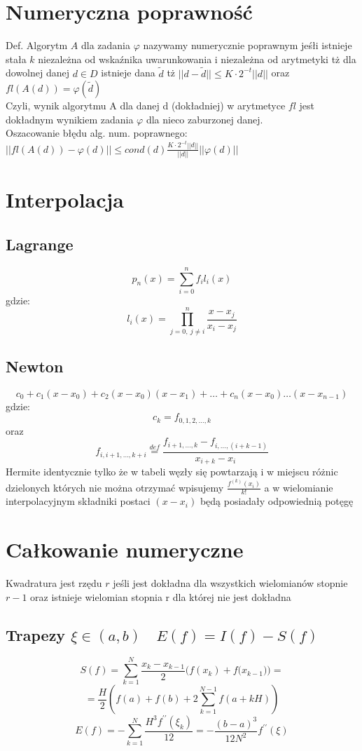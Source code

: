 \documentclass[twocolumn]{article}
\begin{document}
\begin{flushleft}
\section{Numeryczna poprawność}
Def. Algorytm $A$ dla zadania $\varphi$ nazywamy numerycznie poprawnym jeśłi istnieje stała $k$ niezależna od wskaźnika uwarunkowania i niezależna od arytmetyki tż dla dowolnej danej $d \in D$ istnieje dana $\widetilde{d}$ tż $||d-\widetilde{d}|| \leq K\cdot 2^{-t}||d||$ oraz $fl(A(d)) = \varphi(\widetilde{d})$\\
Czyli, wynik algorytmu A dla danej d (dokładniej) w arytmetyce $fl$ jest dokładnym wynikiem zadania $\varphi$ dla nieco zaburzonej danej.\\
Oszacowanie błędu alg. num. poprawnego:\\
$||fl(A(d)) - \varphi(d)|| \leq cond(d) \frac{K\cdot2^{-t}||d||}{||d||}||\varphi(d)||$

\section{Interpolacja}
\subsection{Lagrange}
$$p_{n}(x) = \sum_{i=0}^{n}f_{i}l_{i}(x)$$
gdzie: $$l_i(x) = \prod_{{j = 0},\ {j \neq i}}^{n} \frac{x - x_{j}}{x_{i} - x_{j}}$$
\subsection{Newton}
$$c_{0} + c_{1}(x-x_{0}) + c_{2}(x-x_{0})(x-x_{1}) + \ldots + c_{n}(x-x_{0})\ldots (x-x_{n-1})$$
gdzie: $$c_{k} = f_{0,1,2,\ldots,k}$$ oraz $$f_{i,i+1,\ldots,k+i} \stackrel{def}{=} \frac{f_{i+1,\ldots,k} - f_{i,\ldots,(i+k-1)}}{x_{i+k}-x_{i}}$$
Hermite identycznie tylko że w tabeli węzły się powtarzają i w miejscu różnic dzielonych których nie można otrzymać wpisujemy $\frac{f^{(k)}(x_i)}{k!}$ a w wielomianie interpolacyjnym składniki postaci $(x-x_i)$ będą posiadały odpowiednią potęgę

\section{Całkowanie numeryczne}
Kwadratura jest rzędu $r$ jeśli jest dokładna dla wszystkich wielomianów stopnie $r-1$ oraz istnieje wielomian stopnia r dla której nie jest dokładna\\
\subsection{Trapezy $\xi \in \left(a,b\right) \quad E(f) = I(f) - S(f)$}
$$S(f) = \sum_{k=1}^{N} \frac{x_k - x_{k-1}}{2}{(f(x_k) + f(x_{k-1}})) =$$ $$=\frac{H}{2} \left(f(a)+f(b)+2\sum_{k=1}^{N-1}f(a + kH)\right)$$
$$E(f) = -\sum_{k=1}^{N}\frac{H^3f^{\prime\prime}(\xi_k)}{12} =- \frac{(b-a)^3}{12N^2}f^{\prime\prime}(\xi)$$

\end{flushleft}
\end{document}
